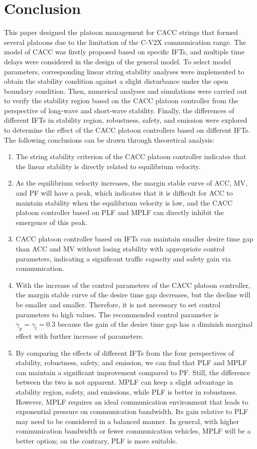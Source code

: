 \documentclass[journal]{IEEEtran}
\begin{document}
\section{Conclusion}
\label{Section 6}
This paper designed the platoon management for CACC strings that formed several platoons due to the limitation of the C-V2X communication range. The model of CACC was firstly proposed based on specific IFTs, and multiple time delays were considered in the design of the general model. To select model parameters, corresponding linear string stability analyses were implemented to obtain the stability condition against a slight disturbance under the open boundary condition. Then, numerical analyses and simulations were carried out to verify the stability region based on the CACC platoon controller from the perspective of long-wave and short-wave stability. Finally, the differences of different IFTs in stability region, robustness, safety, and emission were explored to determine the effect of the CACC platoon controllers based on different IFTs. The following conclusions can be drawn through theoretical analysis:
\begin{enumerate}
	\item The string stability criterion of the CACC platoon controller indicates that the linear stability is directly related to equilibrium velocity.
	\item As the equilibrium velocity increases, the margin stable curve of ACC, MV, and PF will have a peak, which indicates that it is difficult for ACC to maintain stability when the equilibrium velocity is low, and the CACC platoon controller based on PLF and MPLF can directly inhibit the emergence of this peak.
	\item CACC platoon controller based on IFTs can maintain smaller desire time gap than ACC and MV without losing stability with appropriate control parameters, indicating a significant traffic capacity and safety gain via communication.
	\item With the increase of the control parameters of the CACC platoon controller, the margin stable curve of the desire time gap decreases, but the decline will be smaller and smaller. Therefore, it is not necessary to set control parameters to high values. The recommended control parameter is $\gamma_p=\gamma_l=0.3$ because the gain of the desire time gap has a diminish marginal effect with further increase of parameters.
	\item By comparing the effects of different IFTs from the four perspectives of stability, robustness, safety, and emission, we can find that PLF and MPLF can maintain a significant improvement compared to PF. Still, the difference between the two is not apparent. MPLF can keep a slight advantage in stability region, safety, and emissions, while PLF is better in robustness. However, MPLF requires an ideal communication environment that leads to exponential pressure on communication bandwidth. Its gain relative to PLF may need to be considered in a balanced manner. In general, with higher communication bandwidth or fewer communication vehicles, MPLF will be a better option; on the contrary, PLF is more suitable.
\end{enumerate}
\end{document}

